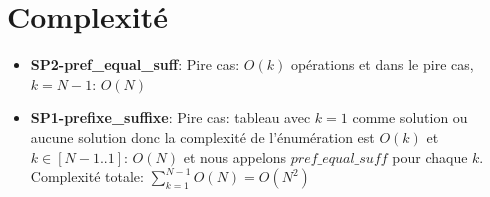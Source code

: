 \section{Complexité}\label{complexite}

\begin{itemize}
    \item \textbf{SP2-pref\_equal\_suff}:
        Pire cas: $O(k)$ opérations et dans le pire cas, $k = N-1$: $O(N)$

    \item \textbf{SP1-prefixe\_suffixe}:
        Pire cas: tableau avec $k=1$ comme solution ou aucune solution donc
        la complexité de l'énumération est $O(k)$ et $k \in [N-1..1]$: $O(N)$
        et nous appelons $pref\_equal\_suff$ pour chaque $k$.
        Complexité totale:
        $\sum_{k=1}^{N-1} O(N) = O(N^2)$

\end{itemize}

